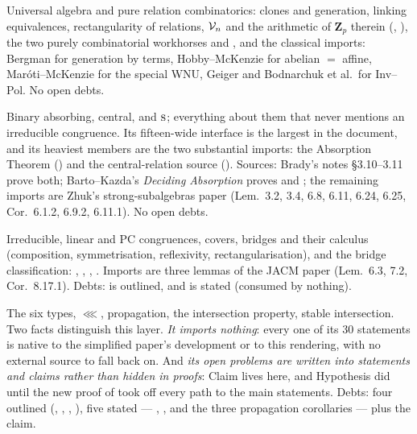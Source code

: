 \begin{description}\tightlist

\item[L0 --- foundations.] Universal algebra and pure relation combinatorics:
clones and generation, linking equivalences, rectangularity of relations,
$\mathcal V_{n}$ and the arithmetic of $\mathbf Z_{p}$ therein
(, ), the two purely
combinatorial workhorses  and
, and the classical imports: Bergman for generation by
terms, Hobby--McKenzie for abelian $=$ affine, Mar\'oti--McKenzie for the
special WNU, Geiger and Bodnarchuk et al.\ for Inv--Pol. No open debts.

\item[L1 --- absorption.] Binary absorbing, central, and $\textup{\textsc{s}}$; everything
about them that never mentions an irreducible congruence. Its fifteen-wide
interface is the largest in the document, and its heaviest members are the two
substantial imports: the Absorption Theorem ()
and the central-relation source ().
Sources: Brady's notes \S3.10--3.11 prove both; Barto--Kazda's \emph{Deciding
Absorption} proves  and
; the remaining imports are Zhuk's strong-subalgebras
paper (Lem.~3.2, 3.4, 6.8, 6.11, 6.24, 6.25, Cor.~6.1.2, 6.9.2, 6.11.1). No
open debts.

\item[L2 --- congruences and bridges.] Irreducible, linear and PC congruences,
covers, bridges and their calculus (composition, symmetrisation,
reflexivity, rectangularisation), and the bridge classification:
, ,
, . Imports are
three lemmas of the JACM paper (Lem.~6.3, 7.2, Cor.~8.17.1). Debts:
 is outlined, and  is
stated (consumed by nothing).

\item[L3 --- strong subuniverses.] The six types, $\lll$, propagation,
the intersection property, stable intersection. Two facts distinguish this
layer. \emph{It imports nothing}: every one of its 30 statements is native to
the simplified paper's development or to this rendering, with no external
source to fall back on.
And \emph{its open problems are written into statements and claims rather
than hidden in proofs}: Claim  lives here, and
Hypothesis  did until the new proof of
 took  off every
path to the main statements. Debts: four outlined
(,
, ,
), five stated ---
, , and the three
propagation corollaries --- plus the claim.


\end{description}
